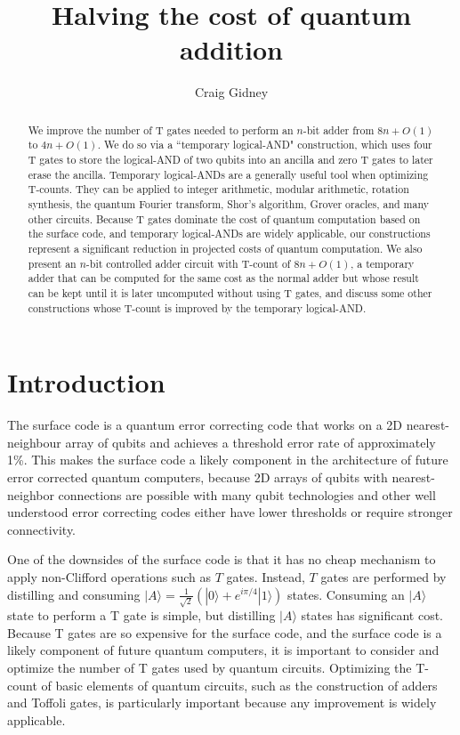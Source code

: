 \documentclass[twocolumn]{revtex4-1}
\begin{document}
\title{Halving the cost of quantum addition}
\author{Craig Gidney}

\begin{abstract}
We improve the number of T gates needed to perform an $n$-bit adder from $8n + O(1)$ \citep{Amy2013, Cuccaro2004, AustinDiscussionsAndEmails2017} to $4n + O(1)$.
We do so via a ``temporary logical-AND" construction, which uses four T gates to store the logical-AND of two qubits into an ancilla and zero T gates to later erase the ancilla.
Temporary logical-ANDs are a generally useful tool when optimizing T-counts.
They can be applied to integer arithmetic, modular arithmetic, rotation synthesis, the quantum Fourier transform, Shor's algorithm, Grover oracles, and many other circuits.
Because T gates dominate the cost of quantum computation based on the surface code, and temporary logical-ANDs are widely applicable, our constructions represent a significant reduction in projected costs of quantum computation.
We also present an $n$-bit controlled adder circuit with T-count of $8n + O(1)$, a temporary adder that can be computed for the same cost as the normal adder but whose result can be kept until it is later uncomputed without using T gates, and discuss some other constructions whose T-count is improved by the temporary logical-AND.
\end{abstract}

\maketitle

\section*{Introduction}

The surface code \citep{Brav98,Denn02,Raus07,Raus07d,Fowler2012} is a quantum error correcting code that works on a 2D nearest-neighbour array of qubits and achieves a threshold error rate of approximately 1\%.
This makes the surface code a likely component in the architecture of future error corrected quantum computers, because 2D arrays of qubits with nearest-neighbor connections are possible with many qubit technologies \citep{Schl11,Bare13,Gamb17,Leik17,Laht17} and other well understood error correcting codes either have lower thresholds or require stronger connectivity.

One of the downsides of the surface code is that it has no cheap mechanism to apply non-Clifford operations such as $T$ gates.
Instead, $T$ gates are performed by distilling and consuming $|A\rangle = \frac{1}{\sqrt{2}} (|0\rangle + e^{i \pi/4} |1\rangle)$ states.
Consuming an $|A\rangle$ state to perform a T gate is simple, but distilling $|A\rangle$ states has significant cost.
Because T gates are so expensive for the surface code, and the surface code is a likely component of future quantum computers, it is important to consider and optimize the number of T gates used by quantum circuits.
Optimizing the T-count of basic elements of quantum circuits, such as the construction of adders and Toffoli gates, is particularly important because any improvement is widely applicable.
\end{document}

